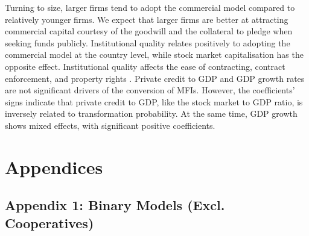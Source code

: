 \documentclass[a4paper, nobind]{templates/ociamthesis}
\begin{document}
Turning to size, larger firms tend to adopt the commercial model compared to relatively younger firms. We expect that larger firms are better at attracting commercial capital courtesy of the goodwill and the collateral to pledge when seeking funds publicly. Institutional quality relates positively to adopting the commercial model at the country level, while stock market capitalisation has the opposite effect. Institutional quality affects the ease of contracting, contract enforcement, and property rights \autocite{claessens2003financial}. Private credit to GDP and GDP growth rates are not significant drivers of the conversion of MFIs. However, the coefficients' signs indicate that private credit to GDP, like the stock market to GDP ratio, is inversely related to transformation probability. At the same time, GDP growth shows mixed effects, with significant positive coefficients.

\newpage

\hypertarget{appendices}{%
\section{Appendices}\label{appendices}}

\hypertarget{appendix-1-binary-models-excl.-cooperatives}{%
\subsection{Appendix 1: Binary Models (Excl. Cooperatives)}\label{appendix-1-binary-models-excl.-cooperatives}}
\end{document}
